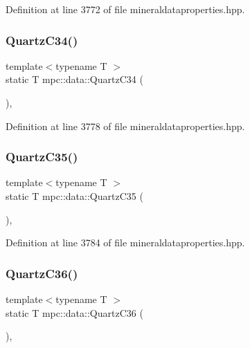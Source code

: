 Definition at line 3772 of file mineraldataproperties.\+hpp.

\mbox{\label{namespacempc_1_1data_afc8740dfef007c43337f0895455462b7}} 
\subsubsection{\texorpdfstring{Quartz\+C34()}{QuartzC34()}}
{\footnotesize\ttfamily template$<$typename T $>$ \\
static T mpc\+::data\+::\+Quartz\+C34 (\begin{DoxyParamCaption}{ }\end{DoxyParamCaption})\hspace{0.3cm}{\ttfamily [inline]}, {\ttfamily [static]}}



Definition at line 3778 of file mineraldataproperties.\+hpp.

\mbox{\label{namespacempc_1_1data_a3b7ce8993e7675fad907410daa83e653}} 
\subsubsection{\texorpdfstring{Quartz\+C35()}{QuartzC35()}}
{\footnotesize\ttfamily template$<$typename T $>$ \\
static T mpc\+::data\+::\+Quartz\+C35 (\begin{DoxyParamCaption}{ }\end{DoxyParamCaption})\hspace{0.3cm}{\ttfamily [inline]}, {\ttfamily [static]}}



Definition at line 3784 of file mineraldataproperties.\+hpp.

\mbox{\label{namespacempc_1_1data_a7e7c64e2af31e8cab324518000ebc032}} 
\subsubsection{\texorpdfstring{Quartz\+C36()}{QuartzC36()}}
{\footnotesize\ttfamily template$<$typename T $>$ \\
static T mpc\+::data\+::\+Quartz\+C36 (\begin{DoxyParamCaption}{ }\end{DoxyParamCaption})\hspace{0.3cm}{\ttfamily [inline]}, {\ttfamily [static]}}



